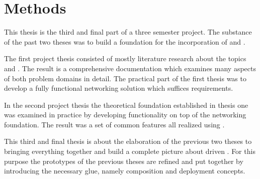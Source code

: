 \chapter{Methods}

This thesis is the third and final part of a three semester project. The
substance of the past two theses was to build a foundation for the incorporation
of \mss{} and \ogs{}. 

The first project thesis consisted of mostly literature research about the
topics \ogs{} and \mss{}. The result is a comprehensive documentation which
examines many aspects of both problem domains in detail. The practical part of
the first thesis was to develop a fully functional \ms{} networking solution
which suffices \og{} requirements.

In the second project thesis the theoretical foundation established in thesis
one was examined in practice by developing \og{} functionality on top of the
networking foundation. The result was a set of common \og{} features all
realized using \mss{}.

This third and final thesis is about the elaboration of the previous two theses
to bringing everything together and build a complete picture about \ms{} driven
\ogs{}. For this purpose the prototypes of the previous theses are refined and
put together by introducing the necessary glue, namely \ms{} composition and
deployment concepts.






















